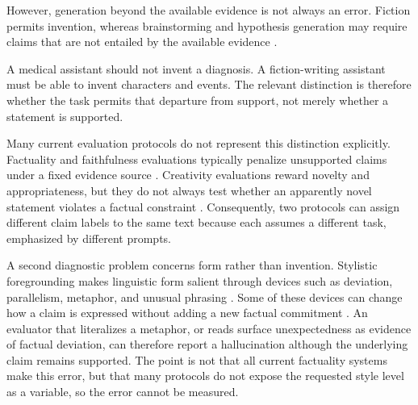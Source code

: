 \documentclass{clv2025}
\begin{document}
However, generation beyond the available evidence is not always an error.
Fiction permits invention, whereas brainstorming and hypothesis generation may require claims that are not entailed by the available evidence \citep{franceschelli_creativity_2024,jiang_survey_2024,sui_confabulation_2024}.

A medical assistant should not invent a diagnosis.
A fiction-writing assistant must be able to invent characters and events.
The relevant distinction is therefore whether the task permits that departure from support, not merely whether a statement is supported.

Many current evaluation protocols do not represent this distinction explicitly.
Factuality and faithfulness evaluations typically penalize unsupported claims under a fixed evidence source \citep{maynez_faithfulness_2020,bang_hallulens_2025}.
Creativity evaluations reward novelty and appropriateness, but they do not always test whether an apparently novel statement violates a factual constraint \citep{acar_creativity_2019,hou_creativityprism_2025}.
Consequently, two protocols can assign different claim labels to the same text because each  assumes a different task, emphasized by different prompts.

A second diagnostic problem concerns form rather than invention.
Stylistic foregrounding makes linguistic form salient through devices such as deviation, parallelism, metaphor, and unusual phrasing \citep{leech_short_style_1981,vanpeer_stylistics_2020}.
Some of these devices can change how a claim is expressed without adding a new factual commitment \citep{badathala_match_2023,jin_deep_2022}.
An evaluator that literalizes a metaphor, or reads surface unexpectedness as evidence of factual deviation, can therefore report a hallucination although the underlying claim remains supported.
The point is not that all current factuality systems make this error, but that many protocols do not expose the requested style level as a variable, so the error cannot be measured.
\end{document}
